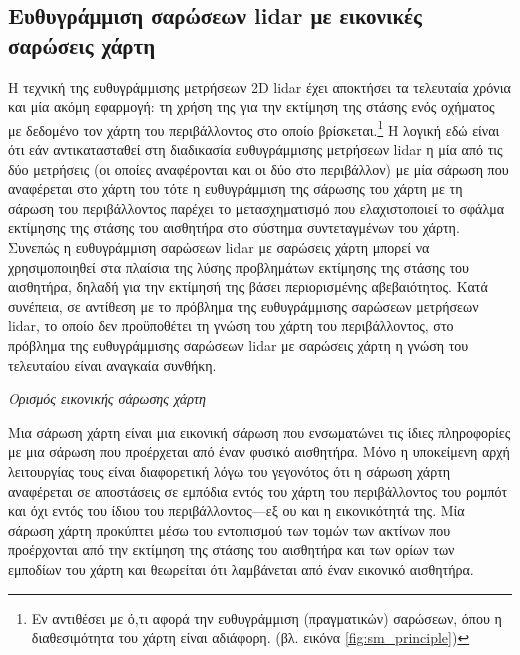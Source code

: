 \subsection{Ευθυγράμμιση σαρώσεων lidar με εικονικές σαρώσεις χάρτη}
\label{subsec:01_01_02_6}

Η τεχνική της ευθυγράμμισης μετρήσεων 2D lidar έχει αποκτήσει τα τελευταία
χρόνια και μία ακόμη εφαρμογή: τη χρήση της για την εκτίμηση της στάσης ενός
οχήματος με δεδομένο τον χάρτη του περιβάλλοντος στο οποίο
βρίσκεται.\footnote{Εν αντιθέσει με ό,τι αφορά την ευθυγράμμιση (πραγματικών)
σαρώσεων, όπου η διαθεσιμότητα του χάρτη είναι αδιάφορη. (βλ. εικόνα
\ref{fig:sm_principle})} Η λογική εδώ είναι ότι εάν αντικατασταθεί στη
διαδικασία ευθυγράμμισης μετρήσεων lidar η μία από τις δύο μετρήσεις (οι οποίες
αναφέρονται και οι δύο στο περιβάλλον) με μία σάρωση που αναφέρεται στο χάρτη
του τότε η ευθυγράμμιση της σάρωσης του χάρτη με τη σάρωση του περιβάλλοντος
παρέχει το μετασχηματισμό που ελαχιστοποιεί το σφάλμα εκτίμησης της στάσης του
αισθητήρα στο σύστημα συντεταγμένων του χάρτη. Συνεπώς η ευθυγράμμιση σαρώσεων
lidar με σαρώσεις χάρτη μπορεί να χρησιμοποιηθεί στα πλαίσια της λύσης
προβλημάτων εκτίμησης της στάσης του αισθητήρα, δηλαδή για την εκτίμησή της
βάσει περιορισμένης αβεβαιότητος. Κατά συνέπεια, σε αντίθεση με το πρόβλημα της
ευθυγράμμισης σαρώσεων μετρήσεων lidar, το οποίο δεν προϋποθέτει τη γνώση του
χάρτη του περιβάλλοντος, στο πρόβλημα της ευθυγράμμισης σαρώσεων lidar με
σαρώσεις χάρτη η γνώση του τελευταίου είναι αναγκαία συνθήκη.


\begin{bw_box}
\begin{definition}
\label{def:map_scan}
\textit{Ορισμός εικονικής σάρωσης χάρτη}

Μια σάρωση χάρτη είναι μια εικονική σάρωση που ενσωματώνει τις ίδιες
πληροφορίες με μια σάρωση που προέρχεται από έναν φυσικό αισθητήρα. Μόνο η
υποκείμενη αρχή λειτουργίας τους είναι διαφορετική λόγω του γεγονότος ότι η
σάρωση χάρτη αναφέρεται σε αποστάσεις σε εμπόδια εντός του χάρτη του
περιβάλλοντος του ρομπότ και όχι εντός του ίδιου του περιβάλλοντος---εξ ου
και η εικονικότητά της. Μία σάρωση χάρτη προκύπτει μέσω του εντοπισμού των
τομών των ακτίνων που προέρχονται από την εκτίμηση της στάσης του αισθητήρα
και των ορίων των εμποδίων του χάρτη και θεωρείται ότι λαμβάνεται από έναν
εικονικό αισθητήρα.
\end{definition}
\end{bw_box}

